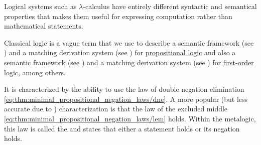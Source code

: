 Logical systems such as \( \lambda \)-calculus have entirely different syntactic and semantical properties that makes them useful for expressing computation rather than mathematical statements.

\begin{definition}\label{def:classical_logic}
  Classical logic is a vague term that we use to describe a semantic framework (see ) and a matching derivation system (see ) for \hyperref[sec:propositional_logic]{propositional logic} and also a semantic framework (see ) and a matching derivation system (see ) for \hyperref[sec:first_order_logic]{first-order logic}, among others.

  It is characterized by the ability to use the law of double negation elimination \eqref{eq:thm:minimal_propositional_negation_laws/dne}. A more popular (but less accurate due to ) characterization is that the law of the excluded middle \eqref{eq:thm:minimal_propositional_negation_laws/lem} holds. Within the metalogic, this law is called the  and states that either a statement holds or its negation holds.
\end{definition}

